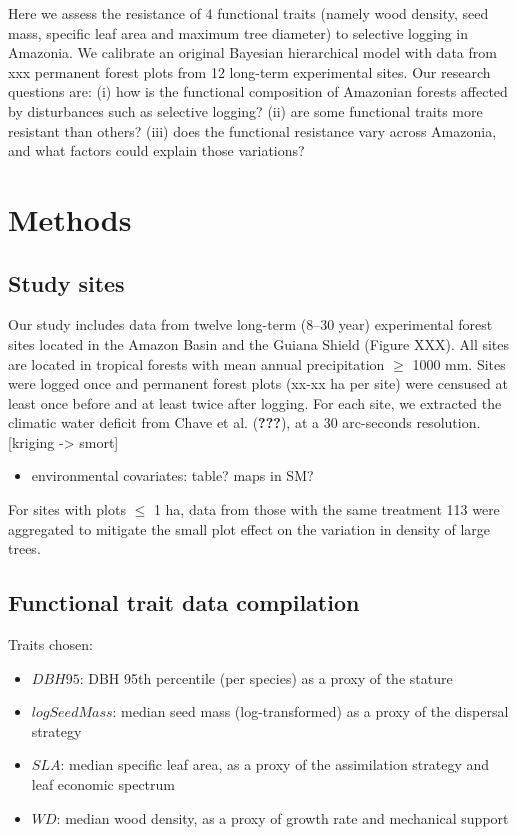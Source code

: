 \documentclass[]{elsarticle} %
\providecommand{\tightlist}{%
  \setlength{\itemsep}{0pt}\setlength{\parskip}{0pt}}
\begin{document}
Here we assess the resistance of 4 functional traits (namely wood
density, seed mass, specific leaf area and maximum tree diameter) to
selective logging in Amazonia. We calibrate an original Bayesian
hierarchical model with data from xxx permanent forest plots from 12
long-term experimental sites. Our research questions are: (i) how is the
functional composition of Amazonian forests affected by disturbances
such as selective logging? (ii) are some functional traits more
resistant than others? (iii) does the functional resistance vary across
Amazonia, and what factors could explain those variations?

\section{Methods}\label{methods}

\subsection{Study sites}\label{study-sites}

Our study includes data from twelve long-term (8--30 year) experimental
forest sites located in the Amazon Basin and the Guiana Shield (Figure
XXX). All sites are located in tropical forests with mean annual
precipitation \(\geq\) 1000 mm. Sites were logged once and permanent
forest plots (xx-xx ha per site) were censused at least once before and
at least twice after logging. For each site, we extracted the climatic
water deficit from Chave et al. ({\textbf{???}}), at a 30 arc-seconds
resolution. {[}kriging -\textgreater{} smort{]}

\begin{itemize}
\tightlist
\item
  environmental covariates: table? maps in SM?
\end{itemize}

For sites with plots \(\leq\) 1 ha, data from those with the same
treatment 113 were aggregated to mitigate the small plot effect on the
variation in density of large trees.

\subsection{Functional trait data
compilation}\label{functional-trait-data-compilation}

Traits chosen:

\begin{itemize}
\item
  \(DBH95\): DBH 95th percentile (per species) as a proxy of the stature
\item
  \(logSeedMass\): median seed mass (log-transformed) as a proxy of the
  dispersal strategy
\item
  \(SLA\): median specific leaf area, as a proxy of the assimilation
  strategy and leaf economic spectrum
\item
  \(WD\): median wood density, as a proxy of growth rate and mechanical
  support
\end{itemize}
\end{document}

